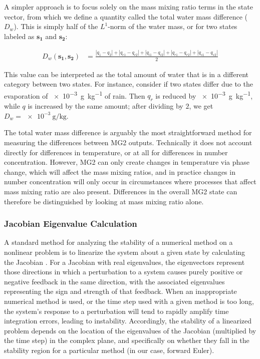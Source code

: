 \documentclass [11pt, proquest] {uwthesis}[2020/02/24]
\begin{document}
A simpler approach is to focus solely on the mass mixing ratio terms in the state vector, from which we define a quantity called the total water mass difference ($D_w$). This is simply half of the $L^1$-norm of the water mass, or for two states labeled as $\mathbf{s_1}$ and $\mathbf{s_2}$:

\begin{eqnarray}
  D_w(\mathbf{s_1}, \mathbf{s_2}) &= \frac{\left|q_1 - q_2\right| + \left|q_{c1} - q_{c2}\right| + \left|q_{i1} - q_{i2}\right| +
    \left|q_{r1} - q_{r2}\right| + \left|q_{s1} - q_{s2}\right|}{2}
\end{eqnarray}

This value can be interpreted as the total amount of water that is in a different category between two states. For instance, consider if two states differ due to the evaporation of \SI{e-3}{\gram\per\kilo\gram} of rain. Then $q_r$ is reduced by \SI{e-3}{\gram\per\kilo\gram}, while $q$ is increased by the same amount; after dividing by $2$, we get $D_w = \SI{e-3}{\gram\per\kilo\gram}$.

The total water mass difference is arguably the most straightforward method for measuring the differences between MG2 outputs. Technically it does not account directly for differences in temperature, or at all for differences in number concentration. However, MG2 can only create changes in temperature via phase change, which will affect the mass mixing ratios, and in practice changes in number concentration will only occur in circumstances where processes that affect mass mixing ratio are also present. Differences in the overall MG2 state can therefore be distinguished by looking at mass mixing ratio alone.

\subsubsection{Jacobian Eigenvalue Calculation}

A standard method for analyzing the stability of a numerical method on a nonlinear problem is to linearize the system about a given state by calculating the Jacobian \parencite{RJL-FDM}. For a Jacobian with real eigenvalues, the eigenvectors represent those directions in which a perturbation to a system causes purely positive or negative feedback in the same direction, with the associated eigenvalues representing the sign and strength of that feedback. When an inappropriate numerical method is used, or the time step used with a given method is too long, the system's response to a perturbation will tend to rapidly amplify time integration errors, leading to instability. Accordingly, the stability of a linearized problem depends on the location of the eigenvalues of the Jacobian (multiplied by the time step) in the complex plane, and specifically on whether they fall in the stability region for a particular method (in our case, forward Euler).
\end{document}
